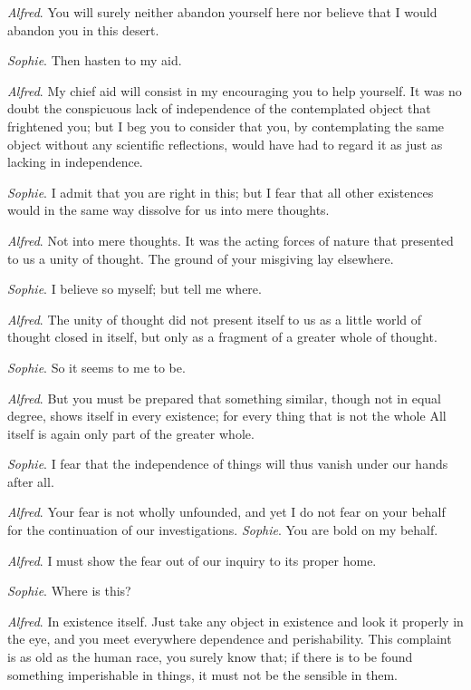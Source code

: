 \documentclass[12pt,a4paper,openany]{book}
\newcommand{\opage}[1]{\marginnote{\footnotesize\textit{[#1]}}}
\begin{document}
\emph{Alfred}. You will surely neither abandon yourself here nor believe that I
would abandon you in this desert.

\emph{Sophie}. Then hasten to my aid.

\emph{Alfred}. My chief aid will consist in my encouraging you to help yourself. It
was no doubt the conspicuous lack of independence of the contemplated object that
frightened you; but I beg you to consider that you, by contemplating the same
object without any scientific reflections, would have had to regard it as just as
lacking in independence.

\emph{Sophie}. I admit that you are right in this; but I fear that all other
existences would in the same way dissolve for us into mere thoughts.

\emph{Alfred}. Not into mere thoughts. It was the acting forces of nature that
presented to us a unity of thought. The ground of your misgiving lay elsewhere.

\emph{Sophie}. I believe so myself; but tell me where.

\emph{Alfred}. The unity of thought did not present itself to us as a little world
of thought closed in itself, but only as a fragment of a greater whole of thought.

\emph{Sophie}. So it seems to me to be.

\emph{Alfred}. But you must be prepared that something similar, though not in equal
degree, shows itself in every existence; for every thing that is not the whole All
itself is again only part of the greater whole.

\emph{Sophie}. I fear that the independence of things will thus vanish under our
hands after all.

\emph{Alfred}. Your fear is not wholly unfounded, and yet I do not fear on your
behalf for the continuation of our investigations.
\setcounter{footnote}{0}%
\opage{63}\emph{Sophie}. You are bold on my behalf.

\emph{Alfred}. I must show the fear out of our inquiry to its proper home.

\emph{Sophie}. Where is this?

\emph{Alfred}. In existence itself. Just take any object in existence and look it
properly in the eye, and you meet everywhere dependence and perishability. This
complaint is as old as the human race, you surely know that; if there is to be
found something imperishable in things, it must not be the sensible in them.
\end{document}
